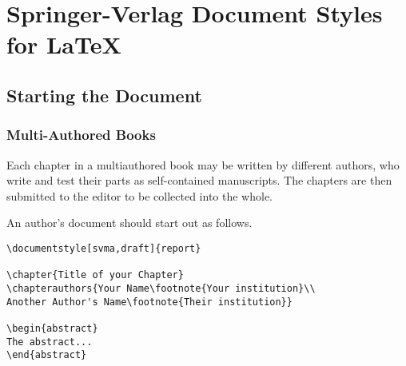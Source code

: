 \def\UNX{UN$\star$X}

\tableofcontents
\chapter{Springer-Verlag Document Styles for \LaTeX}
\begin{abstract}
This document describes the \LaTeX\ styles ``svma,'' Springer-Verlag's
style package for multiauthored books,
and ``svsa,'' Springer-Verlag's style package for single-authored books.
These styles are variations of the standard ``report'' style, and
only the differences are noted here.
For a complete reference, see {\it \LaTeX: A Document Preparation System}
by Leslie Lamport.

A short example of a paper prepared with the ``svma'' style
may be found at the end of this document.
\end{abstract}

\section{Starting the Document}
\label{starting}

\subsection{Multi-Authored Books}
Each chapter in a multiauthored book may be written by different authors,
who write and test their parts as self-contained manuscripts.
The chapters are then submitted to the editor to be collected into the whole.

An author's document should start out as follows.
\begin{verbatim}
\documentstyle[svma,draft]{report}

\chapter{Title of your Chapter}
\chapterauthors{Your Name\footnote{Your institution}\\
Another Author's Name\footnote{Their institution}}

\begin{abstract}
The abstract...
\end{abstract}
\end{verbatim}

